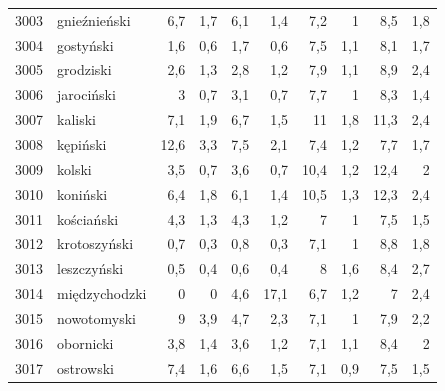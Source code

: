 \begin{center}
\begin{longtable}{lp{3cm}rrrrrrrr}
3003 & gnieźnieński            & 6,7     & 1,7         & 6,1      & 1,4          & 7,2      & 1            & 8,5      & 1,8          \\
3004 & gostyński               & 1,6     & 0,6         & 1,7      & 0,6          & 7,5      & 1,1          & 8,1      & 1,7          \\
3005 & grodziski               & 2,6     & 1,3         & 2,8      & 1,2          & 7,9      & 1,1          & 8,9      & 2,4          \\
3006 & jarociński              & 3       & 0,7         & 3,1      & 0,7          & 7,7      & 1            & 8,3      & 1,4          \\
3007 & kaliski                 & 7,1     & 1,9         & 6,7      & 1,5          & 11       & 1,8          & 11,3     & 2,4          \\
3008 & kępiński                & 12,6    & 3,3         & 7,5      & 2,1          & 7,4      & 1,2          & 7,7      & 1,7          \\
3009 & kolski                  & 3,5     & 0,7         & 3,6      & 0,7          & 10,4     & 1,2          & 12,4     & 2            \\
3010 & koniński                & 6,4     & 1,8         & 6,1      & 1,4          & 10,5     & 1,3          & 12,3     & 2,4          \\
3011 & kościański              & 4,3     & 1,3         & 4,3      & 1,2          & 7        & 1            & 7,5      & 1,5          \\
3012 & krotoszyński            & 0,7     & 0,3         & 0,8      & 0,3          & 7,1      & 1            & 8,8      & 1,8          \\
3013 & leszczyński             & 0,5     & 0,4         & 0,6      & 0,4          & 8        & 1,6          & 8,4      & 2,7          \\
3014 & międzychodzki           & 0       & 0           & 4,6      & 17,1         & 6,7      & 1,2          & 7        & 2,4          \\
3015 & nowotomyski             & 9       & 3,9         & 4,7      & 2,3          & 7,1      & 1            & 7,9      & 2,2          \\
3016 & obornicki               & 3,8     & 1,4         & 3,6      & 1,2          & 7,1      & 1,1          & 8,4      & 2            \\
3017 & ostrowski               & 7,4     & 1,6         & 6,6      & 1,5          & 7,1      & 0,9          & 7,5      & 1,5          \\

\end{longtable}
\end{center}
